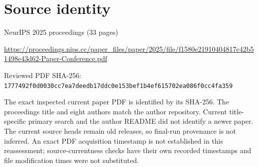 \documentclass[11pt]{article}
\begin{document}
\section*{Source identity}

NeurIPS 2025 proceedings (33 pages)

\url{https://proceedings.nips.cc/paper_files/paper/2025/file/f1580e21910404817c42b51498e43d62-Paper-Conference.pdf}

Reviewed PDF SHA-256: \nolinkurl{1777492f0d0030cc7ea7deedb17ddc0e153bef1b4ef615702ea086f0cc4fa359}

The exact inspected current paper PDF is identified by its SHA-256. The proceedings title and eight authors match the author repository. Current title-specific primary search and the author README did not identify a newer paper. The current source heads remain old releases, so final-run provenance is not inferred. An exact PDF acquisition timestamp is not established in this reassessment; source-currentness checks have their own recorded timestamps and file modification times were not substituted.
\end{document}
